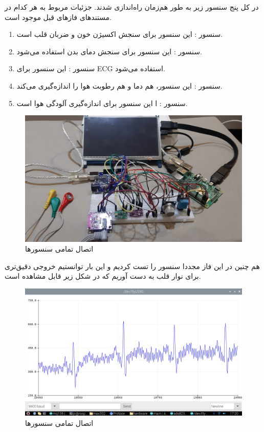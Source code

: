 \documentclass[12pt]{article}
\begin{document}
در کل پنج سنسور زیر به طور هم‌زمان راه‌اندازی شدند. جزئیات مربوط به هر کدام در مستندهای فازهای قبل موجود است.

\begin{enumerate}
	\item 
	سنسور : این سنسور برای سنجش اکسیژن خون و ضربان قلب است.
	
	\item 
	سنسور : این سنسور برای سنجش دمای بدن استفاده می‌شود.
	
	\item 
	سنسور : این سنسور برای ECG استفاده می‌شود.
	
	\item 
	سنسور : این سنسور، هم دما و هم رطوبت هوا را اندازه‌گیری می‌کند.
	
	\item 
	سنسور : ا این سنسور برای اندازه‌گیری آلودگی هوا است. 
\end{enumerate}




\begin{figure}[H]
	\begin{center}
		\includegraphics[width=.80\textwidth]{images/sensors-3.jpg}
	\end{center}
	\caption{اتصال تمامی سنسورها}
\end{figure}

هم چنین در این فاز مجددا سنسور 
را تست کردیم و این بار توانستیم خروجی دقیق‌تری برای نوار قلب به دست آوریم که در شکل زیر قابل مشاهده است.

\begin{figure}[H]
	\begin{center}
		\includegraphics[width=.80\textwidth]{images/ecg-1.png}
	\end{center}
	\caption{اتصال تمامی سنسورها}
\end{figure}
\end{document}
